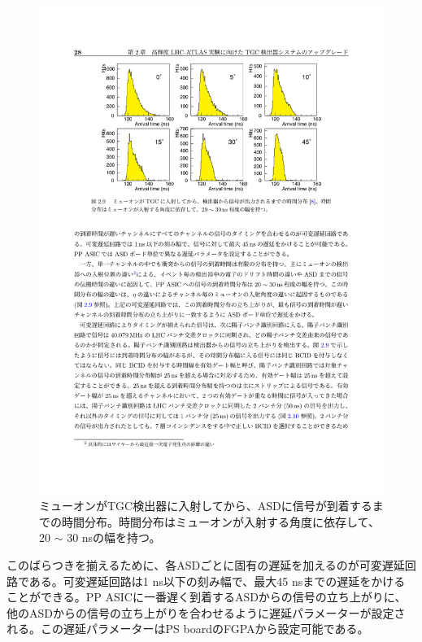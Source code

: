     \begin{figure} 
    \centering
    \includegraphics[width=16cm]{fig/Intro/TGC_fructuation.pdf}
    \caption[ミューオンがTGC検出器に入射してから、ASDに信号が到着するまでの時間分布]{ミューオンがTGC検出器に入射してから、ASDに信号が到着するまでの時間分布\cite{TGC_fructuation}。時間分布はミューオンが入射する角度に依存して、20 $\sim$ 30 nsの幅を持つ。}
    \label{TGC_fructuation}
    \end{figure}

    このばらつきを揃えるために、各ASDごとに固有の遅延を加えるのが可変遅延回路である。可変遅延回路は1 ns以下の刻み幅で、最大45 nsまでの遅延をかけることができる。PP ASICに一番遅く到着するASDからの信号の立ち上がりに、他のASDからの信号の立ち上がりを合わせるように遅延パラメーターが設定される。この遅延パラメーターはPS boardのFGPAから設定可能である。


